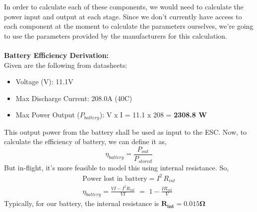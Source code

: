 \documentclass[12pt]{report}
\begin{document}
      In order to calculate each of these components, we would need to calculate the power input and output at each stage. Since we don't currently have access to each component at the moment to calculate the parameters ourselves, we're going to use the parameters provided by the manufacturers for this calculation. \\ \\
      \textbf{\large Battery Efficiency Derivation:}\\
      Given are the following from datasheets:
      \begin{itemize}
        \item Voltage (V): \hfill 11.1V
        \item Max Discharge Current: \hfill 208.0A (40C)
        \item Max Power Output ($ P_{battery} $): \hfill V x I = 11.1 x 208 = \textbf{2308.8 W}
      \end{itemize}
      This output power from the battery shall be used as input to the ESC. Now, to calculate the efficiency of battery, we can define it as, \[ \eta_{battery} = \frac{P_{out}}{P_{stored}} \] But in-flight, it's more feasible to model this using internal resistance. So, 
      \begin{gather*}
        \text{Power lost in battery} = I^2 \, R_{int} \\
        \eta_{battery} = \frac{VI - I^2 R_{int}}{VI} \,\, = \,\, 1 - \frac{IR_{int}}{V}
    \end{gather*}
    Typically, for our battery, the internal resistance is $ \boldsymbol{R_{int} = 0.015 \Omega} $
\end{document}
